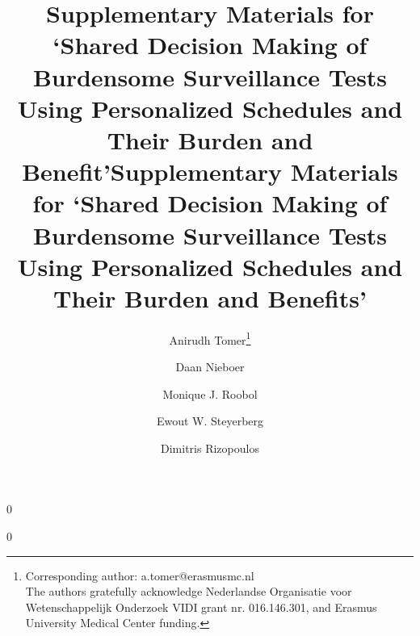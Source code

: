 \documentclass[12pt]{article}
\newcommand{\blind}{0}
\begin{document}
%

\def\spacingset#1{\renewcommand{\baselinestretch}%
{#1}\small\normalsize} \spacingset{1}



\blind
{
  \title{\bf Supplementary Materials for `Shared Decision Making of Burdensome Surveillance Tests Using Personalized Schedules and Their Burden and Benefit'}

\author[1]{Anirudh Tomer\footnote{Corresponding author: a.tomer@erasmusmc.nl\\The authors gratefully acknowledge Nederlandse Organisatie voor Wetenschappelijk Onderzoek VIDI grant nr. 016.146.301, and Erasmus University Medical Center funding.}}
\author[2]{Daan Nieboer}
\author[3]{Monique J. Roobol}
\author[2,4]{Ewout W. Steyerberg}
\author[1]{Dimitris Rizopoulos}




  \maketitle
} \fi

\blind
{
 \title{\bf Supplementary Materials for `Shared Decision Making of Burdensome Surveillance Tests Using Personalized Schedules and Their Burden and Benefits'}
\author{}
\date{\vspace{-2cm}}
\maketitle
} \fi

\newpage
\spacingset{1.5} %


\clearpage

\clearpage

\clearpage

\clearpage

%



\end{document}
